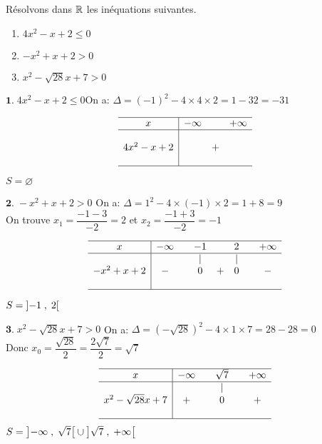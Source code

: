 \begin{example}
Résolvons  dans $ \mathbb{R} $  les inéquations suivantes.
\begin{multicols}{3}

\begin{enumerate}[label=\textbf{\arabic*.}]
\item  $ 4x^{2}-x+2 \leq 0 $
\item  $ -x^{2}+x+2 >0 $
\item  $ x^{2}-\sqrt{28}x+7 > 0 $
  \end{enumerate}
\end{multicols}
 \end{example}
 
  $ \textbf{1.} \; 4x^{2}-x+2 \leq 0 $\qquad On a:\; $ \Delta=(-1)^{2}-4\times4\times2=1-32=-31 $ 

$$\begin{array}{c|ccc}
\hline
x & -\infty & & +\infty \\
\hline
& & & \\
4x^2 - x + 2 & & + & \\
& & & \\
\hline
\end{array}$$

$ S=\varnothing $

\vspace*{0.5cm}
$ \textbf{2.}\; -x^{2}+x+2 >0$ \qquad On a:\; $ \Delta=1^{2}-4\times(-1)\times2=1+8=9 $\\ 
On trouve $x_1= \dfrac{-1-3}{-2}=2$ \;et\; $x_2=\dfrac{-1+3}{-2}=-1 $

$$\begin{array}{c|ccccccc}
\hline
x & -\infty & & -1 & & 2 & & +\infty \\
\hline
& & & \mid & & \mid & & \\
-x^2 + x + 2 & - & & 0 & + & 0 & & - \\
& & & & & & & \\
\hline
\end{array}$$

$ S=\left]-1 \;,\; 2\right[ $


\vspace*{0.5cm}
$ \textbf{3.}\;  x^{2}-\sqrt{28}x+7 > 0$ \qquad On a:\; $ \Delta=(-\sqrt{28})^{2}-4\times 1\times7=28-28=0 $\\
Donc \; $ x_{0}=\dfrac{\sqrt{28}}{2} =\dfrac{2\sqrt{7}}{2}=\sqrt{7}$

$$\begin{array}{c|ccccc}
\hline
x & -\infty & & \sqrt{7} & & +\infty \\
\hline
& & & \mid & & \\
x^2 - \sqrt{28}x + 7 & + & & 0 & & + \\
& & & & & \\
\hline
\end{array}$$
\vspace*{0.3cm}
$ S=\left]-\infty \;,\; \sqrt{7}\right[\cup \left]\sqrt{7} \;,\; +\infty\right[$

